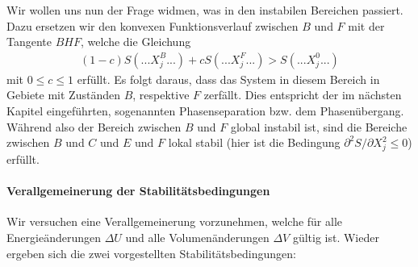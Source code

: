 Wir wollen uns nun der Frage widmen, was in den instabilen Bereichen passiert. 
Dazu ersetzen wir den konvexen Funktionsverlauf zwischen $B$ und $F$ mit der Tangente $BHF$, welche die Gleichung 
\begin{align*}
	(1-c)S(...X_j^B...)+cS(...X_j^F...)>S(...X_j^0...)
\end{align*}
mit $0\leq c\leq 1$ erfüllt.
Es folgt daraus, dass das System in diesem Bereich in Gebiete mit Zuständen $B$, respektive $F$ zerfällt. Dies entspricht der im nächsten Kapitel eingeführten, sogenannten Phasenseparation bzw. dem Phasenübergang. Während also der Bereich zwischen $B$ und $F$ global instabil ist, sind die Bereiche zwischen $B$ und $C$ und $E$ und $F$ lokal stabil (hier ist die Bedingung $\partial ^2S/\partial X_j^2\leq 0$) erfüllt. 

\paragraph*{Verallgemeinerung der Stabilitätsbedingungen} Wir versuchen eine Verallgemeinerung vorzunehmen, welche für alle Energieänderungen $\Delta U$ und alle Volumenänderungen $\Delta V$ gültig ist.
Wieder ergeben sich die zwei vorgestellten Stabilitätsbedingungen:
